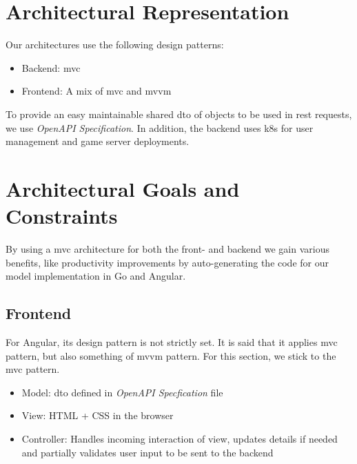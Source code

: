 \documentclass[a4paper,12pt,chapterprefix=false,bibliography=totoc,listof=totoc,]{scrreprt}
\begin{document}
\chapter{Architectural Representation}
Our architectures use the following design patterns:
\begin{itemize}
	\item Backend: \gls{mvc}
	\item Frontend: A mix of \gls{mvc} and \gls{mvvm}
\end{itemize}
To provide an easy maintainable shared \gls{dto} of objects to be used in \gls{rest} requests, we use \textit{OpenAPI Specification}. In addition, the backend uses \gls{k8s} for user management and game server deployments.


\chapter{Architectural Goals and Constraints}
By using a \gls{mvc} architecture for both the front- and backend we gain various benefits, like productivity improvements by auto-generating the code for our model implementation in Go and Angular.
\section{Frontend}
For Angular, its design pattern is not strictly set. It is said that it applies \gls{mvc} pattern, but also something of \gls{mvvm} pattern. For this section, we stick to the \gls{mvc} pattern.
\begin{itemize}
	\item Model: \gls{dto} defined in \textit{OpenAPI Specfication} file
	\item View: HTML + CSS in the browser
	\item Controller: Handles incoming interaction of view, updates details if needed and partially validates user input to be sent to the backend
\end{itemize}
\end{document}
